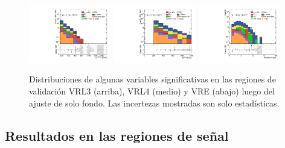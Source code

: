 \begin{figure}[!ht]
    \includegraphics[width=0.32\textwidth]{images/results/fr2_unblind/can_VRE_ph_pt0_afterFit.pdf}
    \includegraphics[width=0.32\textwidth]{images/results/fr2_unblind/can_VRE_met_et_afterFit.pdf}
    \includegraphics[width=0.32\textwidth]{images/results/fr2_unblind/can_VRE_jet_n_afterFit.pdf}

    
    \caption{Distribuciones de algunas variables significativas en las regiones de validación VRL3 (arriba), VRL4 (medio) y VRE (abajo) luego del ajuste de solo fondo. Las incertezas mostradas son solo estadísticas.}
    \label{fig:dist_vrle_bkgonly}
\end{figure}






\subsection{Resultados en las regiones de señal}

